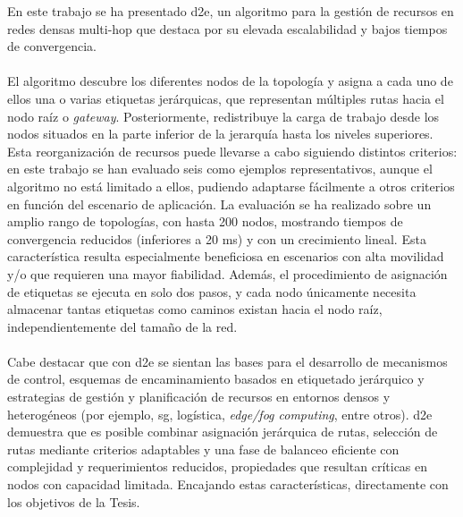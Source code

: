 En este trabajo se ha presentado \gls{d2e}, un algoritmo para la gestión de recursos en redes densas multi-hop que destaca por su elevada escalabilidad y bajos tiempos de convergencia.\\
\\
El algoritmo descubre los diferentes nodos de la topología y asigna a cada uno de ellos una o varias etiquetas jerárquicas, que representan múltiples rutas hacia el nodo raíz o \textit{gateway}. Posteriormente, redistribuye la carga de trabajo desde los nodos situados en la parte inferior de la jerarquía hasta los niveles superiores. Esta reorganización de recursos puede llevarse a cabo siguiendo distintos criterios: en este trabajo se han evaluado seis como ejemplos representativos, aunque el algoritmo no está limitado a ellos, pudiendo adaptarse fácilmente a otros criterios en función del escenario de aplicación. La evaluación se ha realizado sobre un amplio rango de topologías, con hasta 200 nodos, mostrando tiempos de convergencia reducidos (inferiores a 20 ms) y con un crecimiento lineal. Esta característica resulta especialmente beneficiosa en escenarios con alta movilidad y/o que requieren una mayor fiabilidad. Además, el procedimiento de asignación de etiquetas se ejecuta en solo dos pasos, y cada nodo únicamente necesita almacenar tantas etiquetas como caminos existan hacia el nodo raíz, independientemente del tamaño de la red.\\
\\
Cabe destacar que con \gls{d2e} se sientan las bases para el desarrollo de mecanismos de control, esquemas de encaminamiento basados en etiquetado jerárquico y estrategias de gestión y planificación de recursos en entornos densos y heterogéneos (por ejemplo, \gls{sg}, logística, \textit{edge/fog computing}, entre otros). \gls{d2e} demuestra que es posible combinar asignación jerárquica de rutas, selección de rutas mediante criterios adaptables y una fase de balanceo eficiente con complejidad y requerimientos reducidos, propiedades que resultan críticas en nodos con capacidad limitada. Encajando estas características, directamente con los objetivos de la Tesis.
